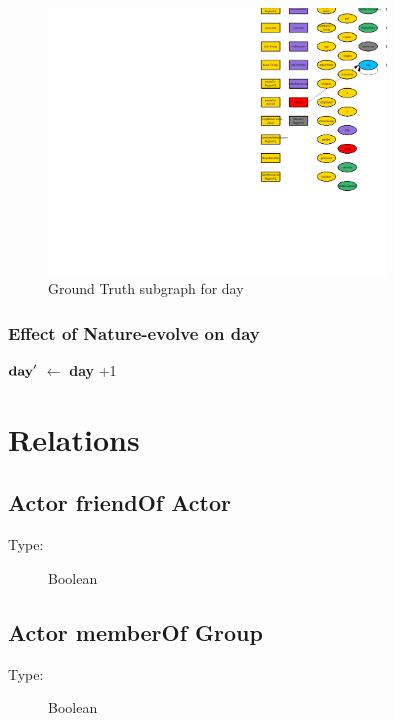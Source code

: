 \documentclass{article}%
\begin{document}
\begin{figure}[ht]%
\centering%
\includegraphics[width=0.8\textwidth]{images/day.png}%
\caption{Ground Truth subgraph for day}%
\end{figure}

%
\subsubsection{Effect of Nature{-}evolve on day}%
\label{ssubsec:Effect of Nature{-}evolve on day}%
\begin{flushleft}%
$\mbox{\textbf{day}} '$%
$\leftarrow$%
\textbf{day}%
+1%
\end{flushleft}

%
\section{Relations}%
\label{sec:Relations}%
\subsection{Actor friendOf Actor}%
\label{subsec:Actor friendOf Actor}%
\begin{description}%
\item[Type:]%
Boolean%
\end{description}

%
\subsection{Actor memberOf Group}%
\label{subsec:Actor memberOf Group}%
\begin{description}%
\item[Type:]%
Boolean%
\end{description}%
\end{document}
